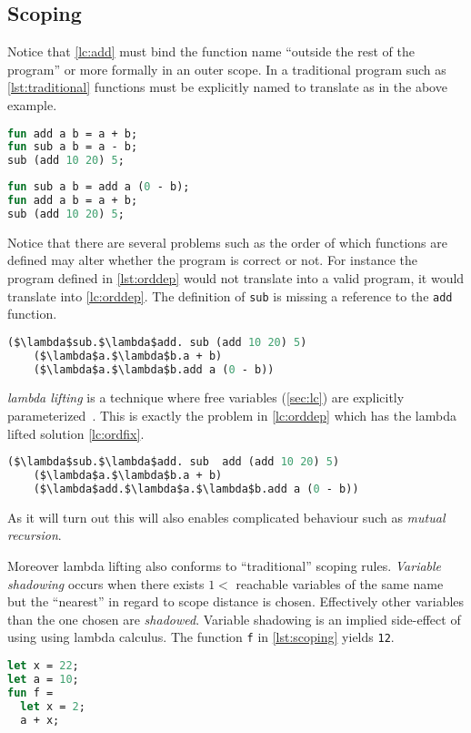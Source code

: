 \documentclass[11pt,oneside,a4paper]{report}
\begin{document}
\subsection{Scoping}\label{scoping}
Notice that \autoref{lc:add} must bind the function name ``outside the rest of the program'' or more formally in an outer scope.
In a traditional program such as \autoref{lst:traditional} functions must be explicitly named to translate as in the above example.
\begin{lstlisting}[float,language=ML,caption={A traditional program},label={lst:traditional}]
fun add a b = a + b;
fun sub a b = a - b;
sub (add 10 20) 5;
\end{lstlisting}
\begin{lstlisting}[float,language=ML,caption={An order dependent program},label={lst:orddep}]
fun sub a b = add a (0 - b);
fun add a b = a + b;
sub (add 10 20) 5;
\end{lstlisting}
Notice that there are several problems such as the order of which functions are defined may alter whether the program is correct or not.
For instance the program defined in \autoref{lst:orddep} would not translate into a valid program, it would translate into \autoref{lc:orddep}.
The definition of \texttt{sub} is missing a reference to the \texttt{add} function.
\begin{lstlisting}[float,language=ML,caption={Add function in lambda calculus},label={lc:orddep},mathescape=true]
($\lambda$sub.$\lambda$add. sub (add 10 20) 5) 
    ($\lambda$a.$\lambda$b.a + b) 
    ($\lambda$a.$\lambda$b.add a (0 - b))
\end{lstlisting}

\textit{lambda lifting} is a technique where free variables (\autoref{sec:lc}) are explicitly parameterized~\cite{johnsson1985lambda}.
This is exactly the problem in \autoref{lc:orddep} which has the lambda lifted solution \autoref{lc:ordfix}.
\begin{lstlisting}[float,language=ML,caption={Order dependent},label={lc:ordfix},mathescape=true]
($\lambda$sub.$\lambda$add. sub  add (add 10 20) 5) 
    ($\lambda$a.$\lambda$b.a + b) 
    ($\lambda$add.$\lambda$a.$\lambda$b.add a (0 - b))
\end{lstlisting}
As it will turn out this will also enables complicated behaviour such as \textit{mutual recursion}.

Moreover lambda lifting also conforms to ``traditional'' scoping rules.
\textit{Variable shadowing} occurs when there exists $1 < $ reachable variables of the same name but the ``nearest'' in regard to scope distance is chosen.
Effectively other variables than the one chosen are \textit{shadowed}.
Variable shadowing is an implied side-effect of using using lambda calculus.
The function \texttt{f} in \autoref{lst:scoping} yields \texttt{12}.
\begin{lstlisting}[float,language=ML,caption={Scoping rules in programming languages},label={lst:scoping}]
let x = 22;
let a = 10;
fun f = 
  let x = 2;
  a + x;
\end{lstlisting}
\end{document}
